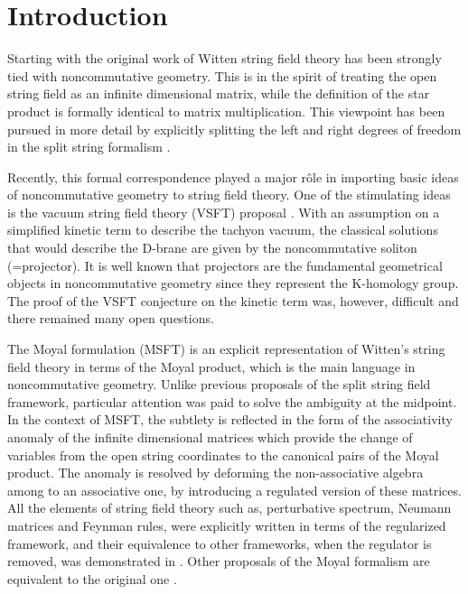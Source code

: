 \documentclass[a4paper,aps,preprint,nofootinbib,eqsecnum]{revtex4}
\begin{document}
\section{Introduction}


{}Starting with the original work of Witten \cite{Witten} string field
theory has been strongly tied with noncommutative geometry. This is in the
spirit of treating the open string field as an infinite dimensional matrix,
while the definition of the star product is formally identical to matrix
multiplication. This viewpoint has been pursued in more detail by explicitly
splitting the left and right degrees of freedom in the split string
formalism \cite{splitSFT}.

Recently, this formal correspondence played a major r\^{o}le in importing
basic ideas of noncommutative geometry to string field theory. One of the
stimulating ideas is the vacuum string field theory (VSFT) proposal \cite%
{VSFT}. With an assumption on a simplified kinetic term to describe the
tachyon vacuum, the classical solutions that would describe the D-brane are
given by the noncommutative soliton \cite{GMS} (=projector). It is well
known that projectors are the fundamental geometrical objects in
noncommutative geometry since they represent the K-homology group. The proof
of the VSFT conjecture on the kinetic term was, however, difficult and there
remained many open questions.

The Moyal formulation \cite{B}\cite{BM1}\cite{BM2}\cite{BKM1}\cite{B2}
(MSFT) is an explicit representation of Witten's string field theory in
terms of the Moyal product, which is the main language in noncommutative
geometry. Unlike previous proposals of the split string field framework,
particular attention was paid to solve the ambiguity at the midpoint. In the
context of MSFT, the subtlety is reflected in the form of the associativity
anomaly \cite{BM1} of the infinite dimensional matrices \coordHE{} which
provide the change of variables from the open string coordinates to the
canonical pairs of the Moyal product. The anomaly is resolved by deforming
the non-associative algebra among \coordHE{} to an associative one, by
introducing a regulated version of these matrices. All the elements of
string field theory such as, perturbative spectrum, Neumann matrices and
Feynman rules, were explicitly written in terms of the regularized
framework, and their equivalence to other frameworks, when the regulator is
removed, was demonstrated in \cite{BM2}\cite{BKM1}. Other proposals of the
Moyal formalism \cite{DLMZ}\cite{Moyal} are equivalent to the original one
\cite{B2}.
\end{document}
